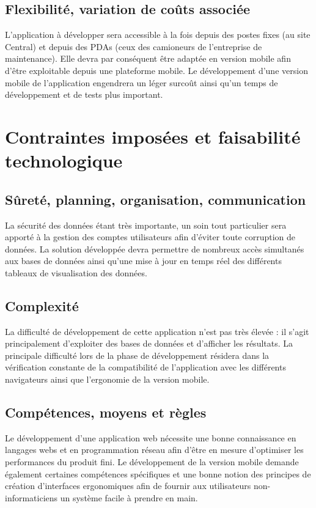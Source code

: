 \subsection{Flexibilité, variation de coûts associée}
L'application à développer sera accessible à la fois depuis des postes fixes (au site Central) et depuis des PDAs (ceux des camioneurs de l'entreprise de maintenance). Elle devra par conséquent être adaptée en version mobile afin d'être exploitable depuis une plateforme mobile. Le développement d'une version mobile de l'application engendrera un léger surcoût ainsi qu'un temps de développement et de tests plus important.

\section{Contraintes imposées et faisabilité technologique}
\subsection{Sûreté, planning, organisation, communication}
La sécurité des données étant très importante, un soin tout particulier sera apporté à la gestion des comptes utilisateurs afin d'éviter toute corruption de données. La solution développée devra permettre de nombreux accès simultanés aux bases de données ainsi qu'une mise à jour en temps réel des différents tableaux de visualisation des données.

\subsection{Complexité}
La difficulté de développement de cette application n'est pas très élevée : il s'agit principalement d'exploiter des bases de données et d'afficher les résultats.
La principale difficulté lors de la phase de développement résidera dans la vérification constante de la compatibilité de l'application avec les différents navigateurs ainsi que l'ergonomie de la version mobile.

\subsection{Compétences, moyens et règles}
Le développement d'une application web nécessite une bonne connaissance en langages webs et en programmation réseau afin d'être en mesure d'optimiser les performances du produit fini. Le développement de la version mobile demande également certaines compétences spécifiques et une bonne notion des principes de création d'interfaces ergonomiques afin de fournir aux utilisateurs non-informaticiens un système facile à prendre en main.

